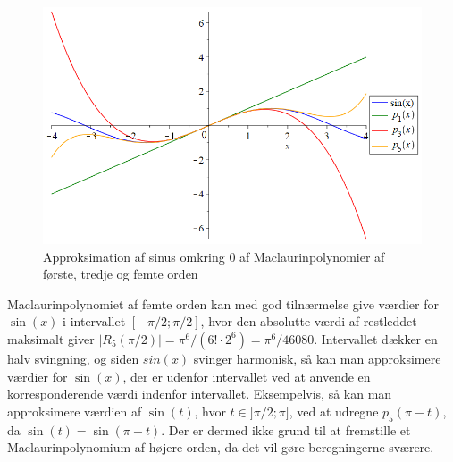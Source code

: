 \begin{figure}[H]
	\centering
	\includegraphics[scale=0.4]{fig/img/taylor_sin}
	\caption{Approksimation af sinus omkring 0 af Maclaurinpolynomier af første, tredje og femte orden}
 	\label{fig:taylor_sin}
\end{figure}
Maclaurinpolynomiet af femte orden kan med god tilnærmelse give værdier for $\sin(x)$ i intervallet $[-\pi /2; \pi /2]$, hvor den absolutte værdi af restleddet maksimalt giver $\left\lvert R_5(\pi/2) \right\lvert = \pi^6/{(6! \cdot 2^6)} = \pi^6/{46080}$. Intervallet dækker en halv svingning, og siden $sin(x)$ svinger harmonisk, så kan man approksimere værdier for $\sin(x)$, der er udenfor intervallet ved at anvende en korresponderende værdi indenfor intervallet. Eksempelvis, så kan man approksimere værdien af $\sin(t)$, hvor $t \in ]\pi/2;\pi]$, ved at udregne $p_5(\pi-t)$, da $\sin(t) = \sin(\pi-t)$. Der er dermed ikke grund til at fremstille et Maclaurinpolynomium af højere orden, da det vil gøre beregningerne sværere.
